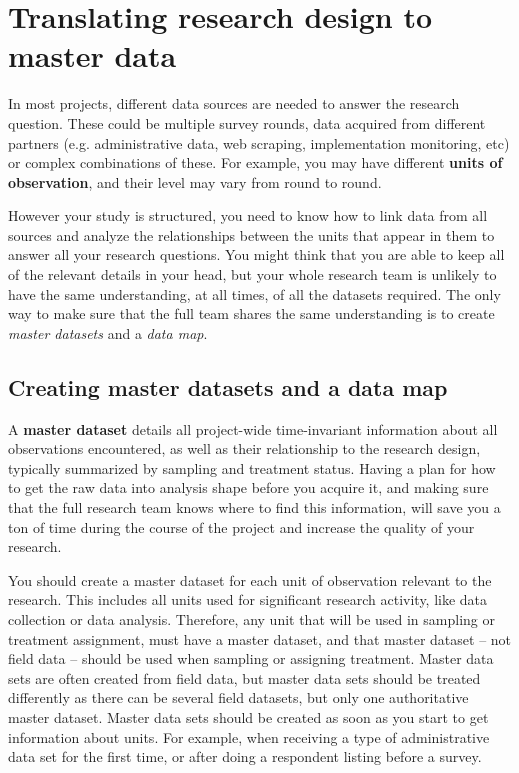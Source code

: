 
\section{Translating research design to master data}

In most projects, different data sources are needed to answer the research question.
These could be multiple survey rounds,
data acquired from different  partners (e.g. administrative data,
web scraping, implementation monitoring, etc)
or complex combinations of these.
For example, you may have different \textbf{units of observation},
and their level may vary from round to round.

However your study is structured, you need to know how to link data from all sources
and analyze the relationships between the units that appear in them
to answer all your research questions.
You might think that you are able to keep all of the relevant details in your head,
but your whole research team is unlikely to have the same understanding,
at all times, of all the datasets required.
The only way to make sure that the full team shares the same understanding
is to create \textit{master datasets} and a \textit{data map}.


\subsection{Creating master datasets and a data map}

A \textbf{master dataset}
details all project-wide time-invariant information
about all observations encountered,
as well as their relationship to the research design,
typically summarized by sampling and treatment status.
Having a plan for how to get the raw data into analysis shape 
before you acquire it,
and making sure that the full research team knows where to find this information,
will save you a ton of time during the course of the project
and increase the quality of your research.

You should create a master dataset
for each unit of observation
relevant to the research.
This includes all units used for significant research activity,
like data collection or data analysis.
Therefore, any unit
that will be used in sampling or treatment assignment,
must have a master dataset,
and that master dataset -- not field data --
should be used when sampling or assigning treatment.
Master data sets are often created from field data,
but master data sets should be treated differently
as there can be several field datasets,
but only one authoritative master dataset.
Master data sets should be created as soon as you
start to get information about units.
For example, when receiving a type of administrative data set for the first time,
or after doing a respondent listing before a survey.

